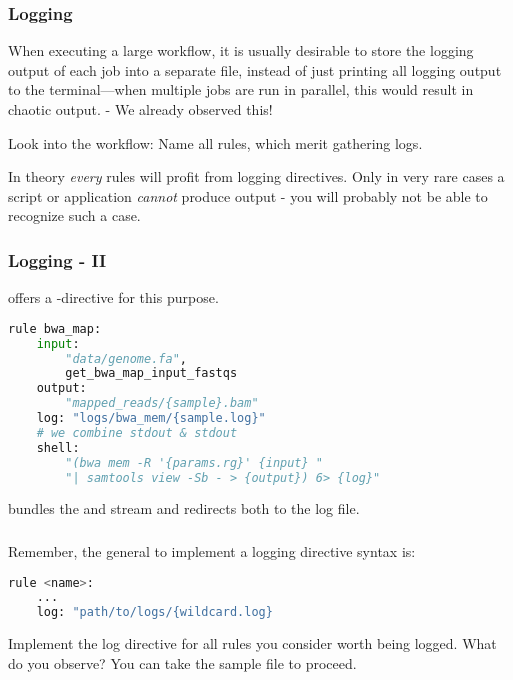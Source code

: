 \begin{frame}[fragile]
  \frametitle{Logging}
  \begin{hint}
  	When executing a large workflow, it is usually desirable to store the logging output of each job into a separate file, instead of just printing all logging output to the terminal—when multiple jobs are run in parallel, this would result in chaotic output. - We already observed this!
  \end{hint}
  \pause
  \begin{task}
  	Look into the workflow: Name all rules, which merit gathering logs.
  \end{task}
  \pause
  \begin{docs}
  	In theory \emph{every} rules will profit from logging directives. Only in very rare cases a script or application \emph{cannot} produce output - you will probably not be able to recognize such a case.
  \end{docs}
\end{frame}

\begin{frame}[fragile]
  \frametitle{Logging - II}
  \Snakemake{} offers a -directive for this purpose.  
  \begin{lstlisting}[language=Python,style=Python]
rule bwa_map:
    input:
        "data/genome.fa",
        get_bwa_map_input_fastqs
    output:
        "mapped_reads/{sample}.bam"
    log: "logs/bwa_mem/{sample.log}"
    # we combine stdout & stdout
    shell:
        "(bwa mem -R '{params.rg}' {input} "
        "| samtools view -Sb - > {output}) 6> {log}"
   \end{lstlisting}
   \begin{docs}[Background]
     \altverb{&} bundles the  and  stream and \altverb{>} redirects both to the log file. 
   \end{docs}
\end{frame}

\begin{frame}[fragile]
  \frametitle{}
  \begin{task}
  	 Remember, the general to implement a logging directive syntax is:
  	 \begin{lstlisting}[language=Python,style=Python]
rule <name>:
    ...
    log: "path/to/logs/{wildcard.log}
  	\end{lstlisting}
    Implement the log directive for all rules you consider worth being logged. What do you observe?
    \newline
    You can take the  sample file to proceed.
  \end{task}
\end{frame}

